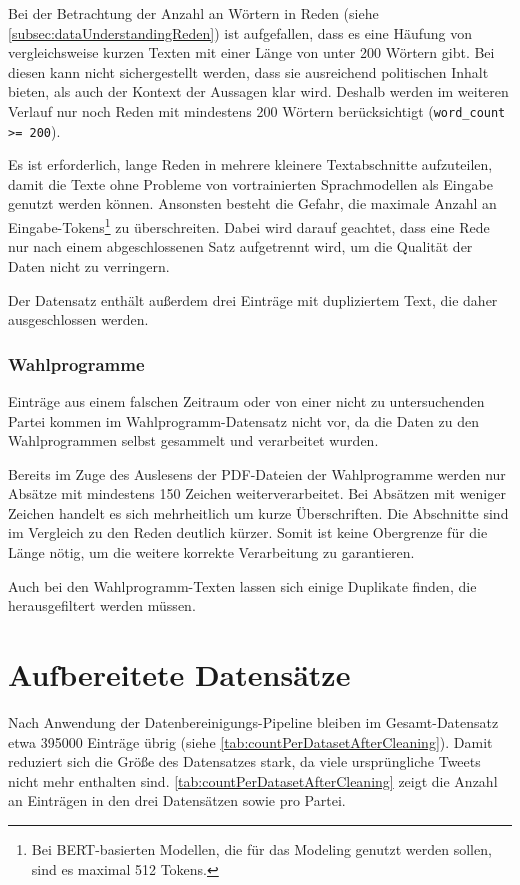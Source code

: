 Bei der Betrachtung der Anzahl an Wörtern in Reden (siehe \autoref{subsec:dataUnderstandingReden}) ist aufgefallen, dass es eine Häufung von vergleichsweise kurzen Texten mit einer Länge von unter \num{200} Wörtern gibt. Bei diesen kann nicht sichergestellt werden, dass sie ausreichend politischen Inhalt bieten, als auch der Kontext der Aussagen klar wird. Deshalb werden im weiteren Verlauf nur noch Reden mit mindestens 200 Wörtern berücksichtigt (\texttt{word\_count >= 200}).

Es ist erforderlich, lange Reden in mehrere kleinere Textabschnitte aufzuteilen, damit die Texte ohne Probleme von vortrainierten Sprachmodellen als Eingabe genutzt werden können. Ansonsten besteht die Gefahr, die maximale Anzahl an Eingabe-Tokens\footnote{Bei \ac{BERT}-basierten Modellen, die für das Modeling genutzt werden sollen, sind es maximal \num{512} Tokens.} zu überschreiten. Dabei wird darauf geachtet, dass eine Rede nur nach einem abgeschlossenen Satz aufgetrennt wird, um die Qualität der Daten nicht zu verringern.

Der Datensatz enthält außerdem drei Einträge mit dupliziertem Text, die daher ausgeschlossen werden.

\subsubsection*{Wahlprogramme}

Einträge aus einem falschen Zeitraum oder von einer nicht zu untersuchenden Partei kommen im Wahlprogramm-Datensatz nicht vor, da die Daten zu den Wahlprogrammen selbst gesammelt und verarbeitet wurden.

Bereits im Zuge des Auslesens der \ac{PDF}-Dateien der Wahlprogramme werden nur Absätze mit mindestens \num{150} Zeichen weiterverarbeitet. Bei Absätzen mit weniger Zeichen handelt es sich mehrheitlich um kurze Überschriften. Die Abschnitte sind im Vergleich zu den Reden deutlich kürzer. Somit ist keine Obergrenze für die Länge nötig, um die weitere korrekte Verarbeitung zu garantieren.

Auch bei den Wahlprogramm-Texten lassen sich einige Duplikate finden, die herausgefiltert werden müssen.


\section{Aufbereitete Datensätze} \label{sec:processedDataframes}

Nach Anwendung der Datenbereinigungs-Pipeline bleiben im Gesamt-Datensatz etwa \num{395000} Einträge übrig (siehe \autoref{tab:countPerDatasetAfterCleaning}). Damit reduziert sich die Größe des Datensatzes stark, da viele ursprüngliche Tweets nicht mehr enthalten sind. \autoref{tab:countPerDatasetAfterCleaning} zeigt die Anzahl an Einträgen in den drei Datensätzen sowie pro Partei.

